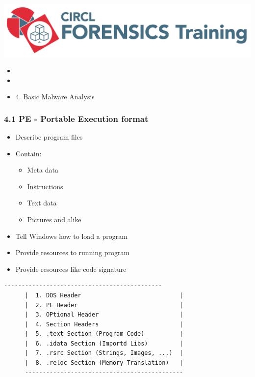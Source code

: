 %
%



\begin{frame}
    \includegraphics[scale=0.3]{images/logo-circl-Forensics.png}
    \begin{itemize}
        \item[]
        \item[]
        \item[] 4. Basic Malware Analysis
    \end{itemize}
\end{frame}


\begin{frame}[fragile]
  \frametitle{4.1 PE - Portable Execution format}
    \begin{itemize}
        \item Describe program files
        \item Contain:
        \begin{itemize}
            \item Meta data
            \item Instructions
            \item Text data
            \item Pictures and alike
        \end{itemize}
        \item Tell Windows how to load a program
        \item Provide resources to running program
        \item Provide resources like code signature
    \end{itemize}
  \begin{lstlisting}[basicstyle=\tiny]
      ---------------------------------------------
      |  1. DOS Header                            |
      |  2. PE Header                             |
      |  3. OPtional Header                       |
      |  4. Section Headers                       |
      |  5. .text Section (Program Code)          |
      |  6. .idata Section (Importd Libs)         |
      |  7. .rsrc Section (Strings, Images, ...)  |
      |  8. .reloc Section (Memory Translation)   |
      ---------------------------------------------
  \end{lstlisting}
\end{frame}


